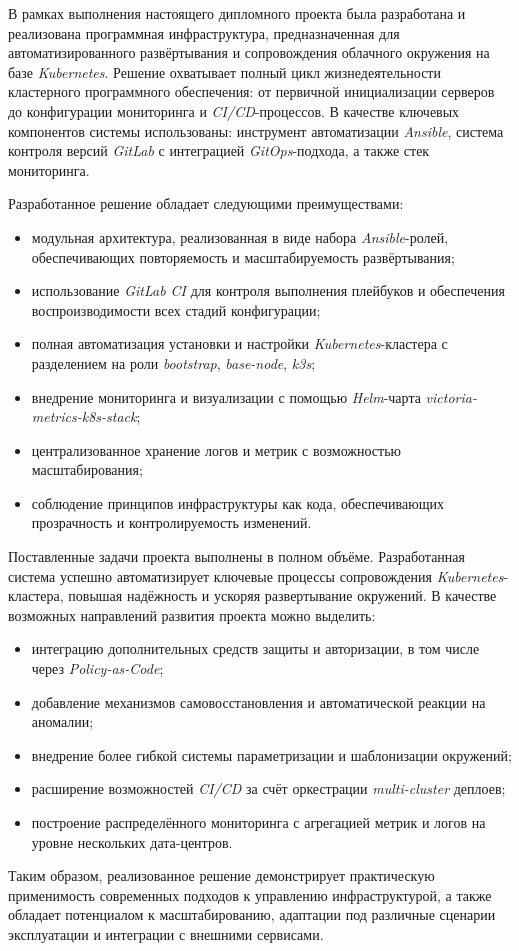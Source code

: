 \label{sec:outro}

В рамках выполнения настоящего дипломного проекта была разработана и реализована программная инфраструктура, предназначенная для автоматизированного развёртывания и сопровождения облачного окружения на базе \textit{Kubernetes}. Решение охватывает полный цикл жизнедеятельности кластерного программного обеспечения: от первичной инициализации серверов до конфигурации мониторинга и \textit{CI/CD}-процессов. В качестве ключевых компонентов системы использованы: инструмент автоматизации \textit{Ansible}, система контроля версий \textit{GitLab} с интеграцией \textit{GitOps}-подхода, а также стек мониторинга.

Разработанное решение обладает следующими преимуществами:
\begin{itemize}
    \item модульная архитектура, реализованная в виде набора \textit{Ansible}-ролей, обеспечивающих повторяемость и масштабируемость развёртывания;
    \item использование \textit{GitLab CI} для контроля выполнения плейбуков и обеспечения воспроизводимости всех стадий конфигурации;
    \item полная автоматизация установки и настройки \textit{Kubernetes}-кластера с разделением на роли \textit{bootstrap}, \textit{base-node}, \textit{k3s};
    \item внедрение мониторинга и визуализации с помощью \textit{Helm}-чарта \textit{victoria-metrics-k8s-stack};
    \item централизованное хранение логов и метрик с возможностью масштабирования;
    \item соблюдение принципов инфраструктуры как кода, обеспечивающих прозрачность и контролируемость изменений.
\end{itemize}

Поставленные задачи проекта выполнены в полном объёме. Разработанная система успешно автоматизирует ключевые процессы сопровождения \textit{Kubernetes}-кластера, повышая надёжность и ускоряя развертывание окружений. В качестве возможных направлений развития проекта можно выделить:
\begin{itemize}
    \item интеграцию дополнительных средств защиты и авторизации, в том числе через \textit{Policy-as-Code};
    \item добавление механизмов самовосстановления и автоматической реакции на аномалии;
    \item внедрение более гибкой системы параметризации и шаблонизации окружений;
    \item расширение возможностей \textit{CI/CD} за счёт оркестрации \textit{multi-cluster} деплоев;
    \item построение распределённого мониторинга с агрегацией метрик и логов на уровне нескольких дата-центров.
\end{itemize}

Таким образом, реализованное решение демонстрирует практическую применимость современных подходов к управлению инфраструктурой, а также обладает потенциалом к масштабированию, адаптации под различные сценарии эксплуатации и интеграции с внешними сервисами.
